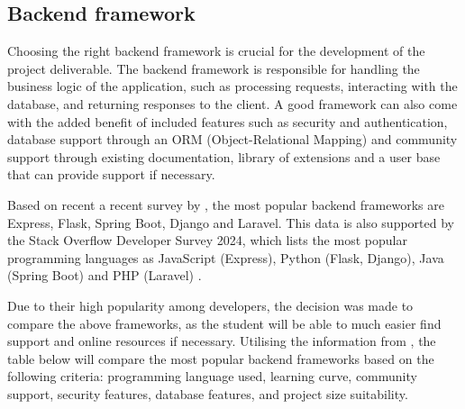\subsection{Backend framework}

Choosing the right backend framework is crucial for the development of the project deliverable. The backend framework is responsible for handling the business logic of the application, such as processing requests, interacting with the database, and returning responses to the client. A good framework can also come with the added benefit of included features such as security and authentication, database support through an ORM (Object-Relational Mapping) and community support through existing documentation, library of extensions and a user base that can provide support if necessary. 

Based on recent a recent survey by \textcite{statista-webframeworks}, the most popular backend frameworks are Express, Flask, Spring Boot, Django and Laravel. This data is also supported by the Stack Overflow Developer Survey 2024, which lists the most popular programming languages as JavaScript (Express), Python (Flask, Django), Java (Spring Boot) and PHP (Laravel) \parencite{stackoverflow}. 

Due to their high popularity among developers, the decision was made to compare the above frameworks, as the student will be able to much easier find support and online resources if necessary. Utilising the information from \textcite{spring,laravel,express,django}, the table below will compare the most popular backend frameworks based on the following criteria: programming language used, learning curve, community support, security features, database features, and project size suitability.

\begin{table}[h]
    \centering
    \caption{Comparison of backend frameworks}
    \label{tab:backend}
\end{table}

